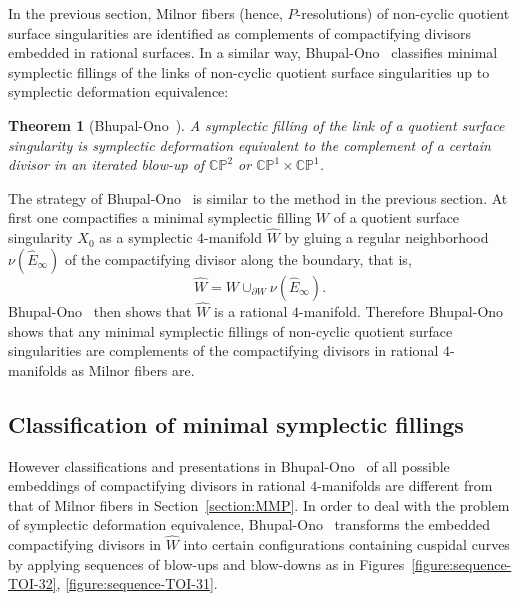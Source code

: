 \documentclass[reqno, twoside, a4paper]{amsart}
\newtheorem{theorem}{Theorem}[section]
\theoremstyle{definition}
\numberwithin{equation}{section}
\begin{document}
In the previous section, Milnor fibers (hence, $P$-resolutions) of non-cyclic quotient surface singularities are identified as complements of compactifying divisors embedded in rational surfaces. In a similar way, Bhupal-Ono~\cite{Bhupal-Ono-2012} classifies minimal symplectic fillings of the links of non-cyclic quotient surface singularities up to symplectic deformation equivalence:

\begin{theorem}[{Bhupal-Ono~\cite[Theorem~1.1]{Bhupal-Ono-2012}}]
\label{theorem:rational}
A symplectic filling of the link of a quotient surface singularity is symplectic deformation equivalent to the complement of a certain divisor in an iterated blow-up of  $\mathbb{CP}^2$ or $\mathbb{CP}^1 \times \mathbb{CP}^1$.
\end{theorem}

The strategy of Bhupal-Ono~\cite{Bhupal-Ono-2012} is similar to the method in the previous section. At first one compactifies a minimal symplectic filling $W$ of a quotient surface singularity $X_0$ as a symplectic $4$-manifold $\widehat{W}$ by gluing a regular neighborhood $\nu(\widehat{E}_{\infty})$ of the compactifying divisor along the boundary, that is,
%
\begin{equation*}
\widehat{W} = W \cup_{\partial W} \nu(\widehat{E}_{\infty}).
\end{equation*}
%
Bhupal-Ono~\cite{Bhupal-Ono-2012} then shows that $\widehat{W}$ is a rational $4$-manifold. Therefore Bhupal-Ono~\cite{Bhupal-Ono-2012} shows that any minimal symplectic fillings of non-cyclic quotient surface singularities are complements of the compactifying divisors in rational $4$-manifolds as Milnor fibers are.






\subsection{Classification of minimal symplectic fillings}
\label{subsection:classification-symplectic-filling}

However classifications and presentations in Bhupal-Ono~\cite{Bhupal-Ono-2012} of all possible embeddings of compactifying divisors in rational $4$-manifolds are different from that of Milnor fibers in Section~\ref{section:MMP}. In order to deal with the problem of symplectic deformation equivalence, Bhupal-Ono~\cite{Bhupal-Ono-2012} transforms the embedded compactifying divisors in $\widehat{W}$ into certain configurations containing cuspidal curves by applying sequences of blow-ups and blow-downs as in Figures~\ref{figure:sequence-TOI-32}, \ref{figure:sequence-TOI-31}.
\end{document}
